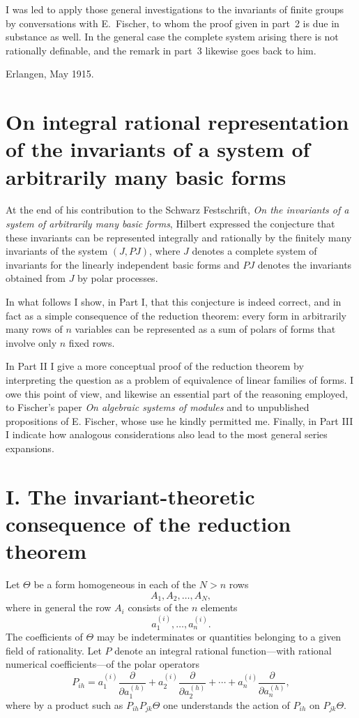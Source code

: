 \documentclass[11pt]{article}
\begin{document}
I was led to apply those general investigations to the invariants of finite groups by conversations with E.~Fischer, to whom the proof given in part~2 is due in substance as well. In the general case the complete system arising there is not rationally definable, and the remark in part~3 likewise goes back to him.

\begin{flushright}
Erlangen, May 1915.
\end{flushright}

\clearpage

\section*{On integral rational representation of the invariants of a system of arbitrarily many basic forms}

At the end of his contribution to the Schwarz Festschrift, \emph{On the invariants of a system of arbitrarily many basic forms}, Hilbert expressed the conjecture that these invariants can be represented integrally and rationally by the finitely many invariants of the system \((J,PJ)\), where \(J\) denotes a complete system of invariants for the linearly independent basic forms and \(PJ\) denotes the invariants obtained from \(J\) by polar processes.

In what follows I show, in Part I, that this conjecture is indeed correct, and in fact as a simple consequence of the reduction theorem: every form in arbitrarily many rows of \(n\) variables can be represented as a sum of polars of forms that involve only \(n\) fixed rows.

In Part II I give a more conceptual proof of the reduction theorem by interpreting the question as a problem of equivalence of linear families of forms. I owe this point of view, and likewise an essential part of the reasoning employed, to Fischer's paper \emph{On algebraic systems of modules} and to unpublished propositions of E. Fischer, whose use he kindly permitted me. Finally, in Part III I indicate how analogous considerations also lead to the most general series expansions.

\section*{I. The invariant-theoretic consequence of the reduction theorem}

Let \(\Theta\) be a form homogeneous in each of the \(N>n\) rows
\[
A_1,A_2,\dots,A_N,
\]
where in general the row \(A_i\) consists of the \(n\) elements
\[
a_1^{(i)},\dots,a_n^{(i)}.
\]
The coefficients of \(\Theta\) may be indeterminates or quantities belonging to a given field of rationality. Let \(P\) denote an integral rational function---with rational numerical coefficients---of the polar operators
\[
P_{ih}
=
a_1^{(i)}\frac{\partial}{\partial a_1^{(h)}}
+
a_2^{(i)}\frac{\partial}{\partial a_2^{(h)}}
+\cdots+
a_n^{(i)}\frac{\partial}{\partial a_n^{(h)}},
\]
where by a product such as \(P_{ih}P_{jk}\Theta\) one understands the action of \(P_{ih}\) on \(P_{jk}\Theta\).
\end{document}

